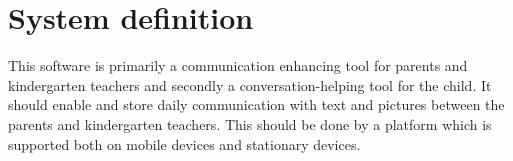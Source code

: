 \section{System definition}
This software is primarily a communication enhancing tool for parents and kindergarten teachers and secondly a conversation-helping tool for the child. It should enable and store daily communication with text and pictures between the parents and kindergarten teachers. This should be done by a platform which is supported both on mobile devices and stationary devices.
\newpage